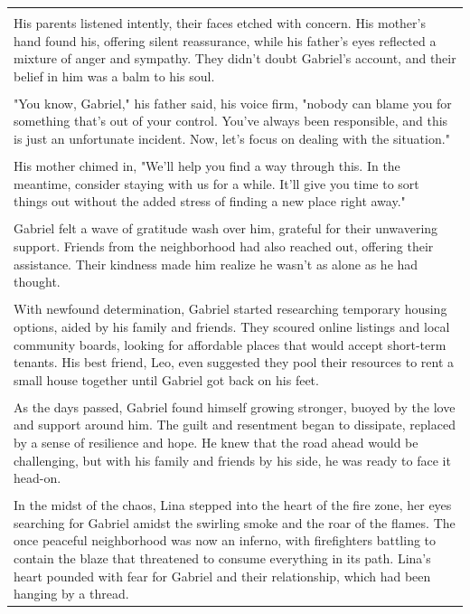\begin{small}
\begin{longtable}{p{}}
\\
\\
His parents listened intently, their faces etched with concern. His mother's hand found his, offering silent reassurance, while his father's eyes reflected a mixture of anger and sympathy. They didn't doubt Gabriel's account, and their belief in him was a balm to his soul.
\\
\\
"You know, Gabriel," his father said, his voice firm, "nobody can blame you for something that's out of your control. You've always been responsible, and this is just an unfortunate incident. Now, let's focus on dealing with the situation."
\\
\\
His mother chimed in, "We'll help you find a way through this. In the meantime, consider staying with us for a while. It'll give you time to sort things out without the added stress of finding a new place right away."
\\
\\
Gabriel felt a wave of gratitude wash over him, grateful for their unwavering support. Friends from the neighborhood had also reached out, offering their assistance. Their kindness made him realize he wasn't as alone as he had thought.
\\
\\
With newfound determination, Gabriel started researching temporary housing options, aided by his family and friends. They scoured online listings and local community boards, looking for affordable places that would accept short-term tenants. His best friend, Leo, even suggested they pool their resources to rent a small house together until Gabriel got back on his feet.
\\
\\
As the days passed, Gabriel found himself growing stronger, buoyed by the love and support around him. The guilt and resentment began to dissipate, replaced by a sense of resilience and hope. He knew that the road ahead would be challenging, but with his family and friends by his side, he was ready to face it head-on.
\\
\\
In the midst of the chaos, Lina stepped into the heart of the fire zone, her eyes searching for Gabriel amidst the swirling smoke and the roar of the flames. The once peaceful neighborhood was now an inferno, with firefighters battling to contain the blaze that threatened to consume everything in its path. Lina's heart pounded with fear for Gabriel and their relationship, which had been hanging by a thread.

\end{longtable}
\end{small}
